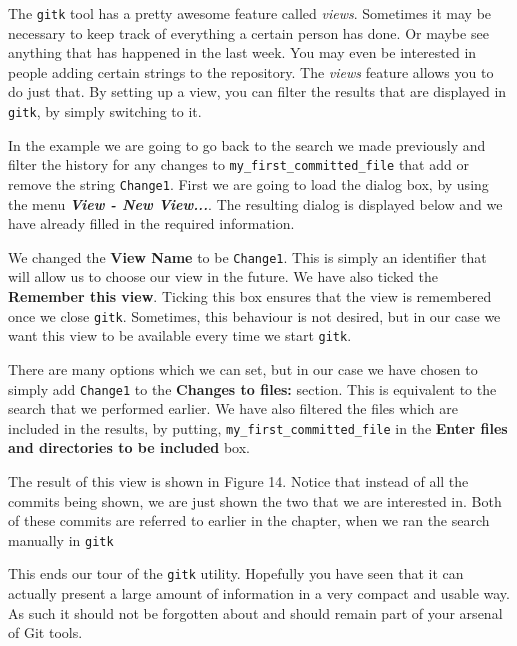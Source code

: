 The \texttt{gitk} tool has a pretty awesome feature called \emph{views}.
Sometimes it may be necessary to keep track of everything a certain person has done.
Or maybe see anything that has happened in the last week.
You may even be interested in people adding certain strings to the repository.
The \emph{views} feature allows you to do just that.
By setting up a view, you can filter the results that are displayed in \texttt{gitk}, by simply switching to it.

In the example we are going to go back to the search we made previously and filter the history for any changes to \texttt{my\_first\_committed\_file} that add or remove the string \texttt{Change1}.
First we are going to load the dialog box, by using the menu \textbf{\emph{View - New View...}}.
The resulting dialog is displayed below and we have already filled in the required information.


We changed the \textbf{View Name} to be \texttt{Change1}.
This is simply an identifier that will allow us to choose our view in the future.
We have also ticked the \textbf{Remember this view}.
Ticking this box ensures that the view is remembered once we close \texttt{gitk}.
Sometimes, this behaviour is not desired, but in our case we want this view to be available every time we start \texttt{gitk}.

There are many options which we can set, but in our case we have chosen to simply add \texttt{Change1} to the \textbf{Changes to files:} section.
This is equivalent to the search that we performed earlier.
We have also filtered the files which are included in the results, by putting, \texttt{my\_first\_committed\_file} in the \textbf{Enter files and directories to be included} box.

The result of this view is shown in Figure 14.
Notice that instead of all the commits being shown, we are just shown the two that we are interested in.
Both of these commits are referred to earlier in the chapter, when we ran the search manually in \texttt{gitk}


This ends our tour of the \texttt{gitk} utility.
Hopefully you have seen that it can actually present a large amount of information in a very compact and usable way.
As such it should not be forgotten about and should remain part of your arsenal of Git tools.

